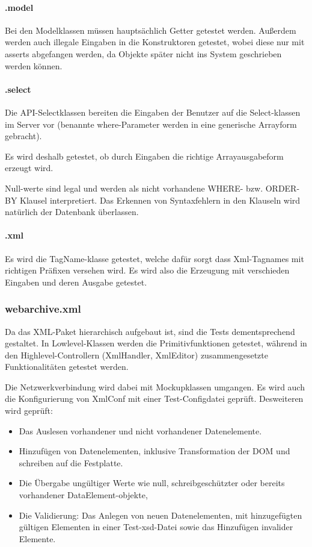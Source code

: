 		\paragraph{.model}
		Bei den Modelklassen müssen hauptsächlich Getter getestet werden.
		Außerdem werden auch illegale Eingaben in die Konstruktoren getestet,
		wobei diese nur mit asserts abgefangen werden, da Objekte später nicht
		ins System geschrieben werden können.
		\paragraph{.select}
		Die API-Selectklassen bereiten die Eingaben der Benutzer auf die
		Select-klassen im Server vor (benannte where-Parameter werden in
		eine generische Arrayform gebracht).

		Es wird deshalb getestet, ob durch Eingaben die richtige Arrayausgabeform erzeugt wird.

		Null-werte sind legal und werden als nicht vorhandene WHERE- bzw. ORDER-BY Klausel interpretiert.
		Das Erkennen von Syntaxfehlern in den Klauseln wird natürlich der Datenbank überlassen.
		\paragraph{.xml}
		Es wird die TagName-klasse getestet, welche dafür sorgt dass Xml-Tagnames mit richtigen Präfixen versehen wird. Es wird also die Erzeugung mit verschieden Eingaben und deren Ausgabe getestet.

	\subsubsection{webarchive.xml}
		Da das XML-Paket hierarchisch aufgebaut ist, sind die Tests dementsprechend gestaltet. 
		In Lowlevel-Klassen werden die Primitivfunktionen getestet, während in den Highlevel-Controllern (XmlHandler, XmlEditor) zusammengesetzte Funktionalitäten getestet werden. 

	Die Netzwerkverbindung wird dabei mit Mockupklassen umgangen. 
	Es wird auch die Konfigurierung von XmlConf mit einer Test-Configdatei geprüft.
	Desweiteren wird geprüft:
	\begin{itemize}
		\item Das Auslesen vorhandener und nicht vorhandener Datenelemente.
		\item Hinzufügen von Datenelementen, inklusive Transformation der DOM und schreiben auf die Festplatte.
		\item Die Übergabe ungültiger Werte wie null, schreibgeschützter oder bereits vorhandener DataElement-objekte, 
		\item Die Validierung: Das Anlegen von neuen Datenelementen, mit hinzugefügten gültigen Elementen in einer Test-xsd-Datei sowie das Hinzufügen invalider Elemente.
	\end{itemize}


